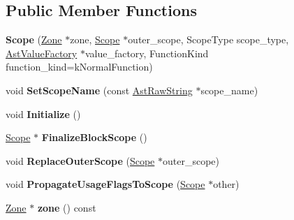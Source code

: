\subsection*{Public Member Functions}
\begin{DoxyCompactItemize}
\item 
{\bfseries Scope} (\hyperlink{classv8_1_1internal_1_1_zone}{Zone} $\ast$zone, \hyperlink{classv8_1_1internal_1_1_scope}{Scope} $\ast$outer\+\_\+scope, Scope\+Type scope\+\_\+type, \hyperlink{classv8_1_1internal_1_1_ast_value_factory}{Ast\+Value\+Factory} $\ast$value\+\_\+factory, Function\+Kind function\+\_\+kind=k\+Normal\+Function)\hypertarget{classv8_1_1internal_1_1_scope_aaa692d3c18231b5eecd7361a024e7fb7}{}\label{classv8_1_1internal_1_1_scope_aaa692d3c18231b5eecd7361a024e7fb7}

\item 
void {\bfseries Set\+Scope\+Name} (const \hyperlink{classv8_1_1internal_1_1_ast_raw_string}{Ast\+Raw\+String} $\ast$scope\+\_\+name)\hypertarget{classv8_1_1internal_1_1_scope_ae9877078e245aeddae0da2bad198c7db}{}\label{classv8_1_1internal_1_1_scope_ae9877078e245aeddae0da2bad198c7db}

\item 
void {\bfseries Initialize} ()\hypertarget{classv8_1_1internal_1_1_scope_a7ff6df027b40c8976b5097c513415ebb}{}\label{classv8_1_1internal_1_1_scope_a7ff6df027b40c8976b5097c513415ebb}

\item 
\hyperlink{classv8_1_1internal_1_1_scope}{Scope} $\ast$ {\bfseries Finalize\+Block\+Scope} ()\hypertarget{classv8_1_1internal_1_1_scope_ac1de3630860a2fb185db850dae9f152c}{}\label{classv8_1_1internal_1_1_scope_ac1de3630860a2fb185db850dae9f152c}

\item 
void {\bfseries Replace\+Outer\+Scope} (\hyperlink{classv8_1_1internal_1_1_scope}{Scope} $\ast$outer\+\_\+scope)\hypertarget{classv8_1_1internal_1_1_scope_ab1003489286e344c4858478f4452142b}{}\label{classv8_1_1internal_1_1_scope_ab1003489286e344c4858478f4452142b}

\item 
void {\bfseries Propagate\+Usage\+Flags\+To\+Scope} (\hyperlink{classv8_1_1internal_1_1_scope}{Scope} $\ast$other)\hypertarget{classv8_1_1internal_1_1_scope_af84640f5df67c96fcb7ea36415f01e6c}{}\label{classv8_1_1internal_1_1_scope_af84640f5df67c96fcb7ea36415f01e6c}

\item 
\hyperlink{classv8_1_1internal_1_1_zone}{Zone} $\ast$ {\bfseries zone} () const \hypertarget{classv8_1_1internal_1_1_scope_ab5d14906e87e8abcce9837bbeb0ed416}{}\label{classv8_1_1internal_1_1_scope_ab5d14906e87e8abcce9837bbeb0ed416}


\end{DoxyCompactItemize}
